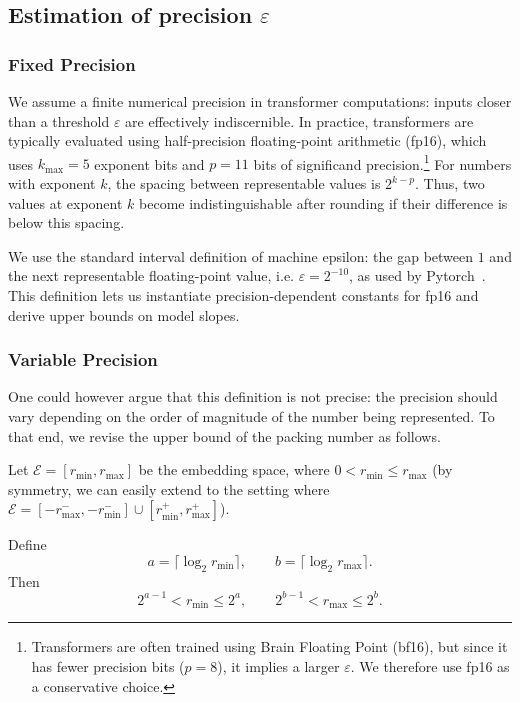 \subsection{Estimation of precision $\varepsilon$}
\label{app:epsilon}

\subsubsection{Fixed Precision}
We assume a finite numerical precision in transformer computations: inputs closer than a threshold $\varepsilon$ are effectively indiscernible. In practice, transformers are typically evaluated using half-precision floating-point arithmetic (fp16), which uses $k_{\max}=5$ exponent bits and $p=11$ bits of significand precision.\footnote{Transformers are often trained using Brain Floating Point (bf16), but since it has fewer precision bits ($p=8$), it implies a larger $\varepsilon$. We therefore use fp16 as a conservative choice.}
For numbers with exponent $k$, the spacing between representable values is $2^{k-p}$. Thus, two values at exponent $k$ become indistinguishable after rounding if their difference is below this spacing.

We use the standard interval definition of machine epsilon: the gap between $1$ and the next representable floating-point value, i.e. $\varepsilon = 2^{-10}$, as used by Pytorch~\citep{pytorchTypeInfo}. 
This definition lets us instantiate precision-dependent constants for fp16 and derive upper bounds on model slopes. 

\subsubsection{Variable Precision}

One could however argue that this definition is not precise: the precision should vary depending on the order of magnitude of the number being represented. To that end, we revise the upper bound of the packing number as follows.

Let $\mathcal E = [r_{\min}, r_{\max}]$ be the embedding space, where $0 < r_{\min} \le r_{\max}$ (by symmetry, we can easily extend to the setting where $\mathcal E=[-r_{\mathrm{max}}^{-},-r_{\mathrm{min}}^{-}]\cup[r_{\mathrm{min}}^{+},r_{\mathrm{max}}^{+}]$).

Define
$$
a = \lceil \log_2 r_{\min} \rceil,
\qquad
b = \lceil \log_2 r_{\max} \rceil.
$$
Then
$$
2^{a-1} < r_{\min} \le 2^a,
\qquad
2^{b-1} < r_{\max} \le 2^b.
$$

